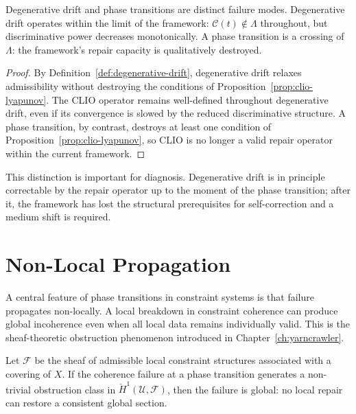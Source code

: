 \documentclass[11pt,openany]{book}
\begin{document}
\begin{proposition}
\label{prop:phase-vs-drift}
Degenerative drift and phase transitions are distinct
failure modes.  Degenerative drift operates within the
limit of the framework: $\mathcal{C}(t) \notin \Lambda$
throughout, but discriminative power decreases
monotonically.  A phase transition is a crossing of
$\Lambda$: the framework's repair capacity is
qualitatively destroyed.
\end{proposition}

\begin{proof}
By Definition~\ref{def:degenerative-drift}, degenerative
drift relaxes admissibility without destroying the
conditions of Proposition~\ref{prop:clio-lyapunov}.  The
CLIO operator remains well-defined throughout degenerative
drift, even if its convergence is slowed by the reduced
discriminative structure.  A phase transition, by contrast,
destroys at least one condition of
Proposition~\ref{prop:clio-lyapunov}, so CLIO is no longer
a valid repair operator within the current framework.
\end{proof}

\begin{remark}
This distinction is important for diagnosis.  Degenerative
drift is in principle correctable by the repair operator
up to the moment of the phase transition; after it, the
framework has lost the structural prerequisites for
self-correction and a medium shift is required.
\end{remark}

\section{Non-Local Propagation}
\label{sec:non-local}

A central feature of phase transitions in constraint systems
is that failure propagates non-locally.  A local breakdown
in constraint coherence can produce global incoherence even
when all local data remains individually valid.  This is
the sheaf-theoretic obstruction phenomenon introduced in
Chapter~\ref{ch:yarncrawler}.

\begin{theorem}
\label{thm:non-local-propagation}
Let $\mathcal{F}$ be the sheaf of admissible local
constraint structures associated with a covering of $X$.
If the coherence failure at a phase transition generates a
non-trivial obstruction class in $\check{H}^1(\mathcal{U},
\mathcal{F})$, then the failure is global: no local repair
can restore a consistent global section.
\end{theorem}
\end{document}
